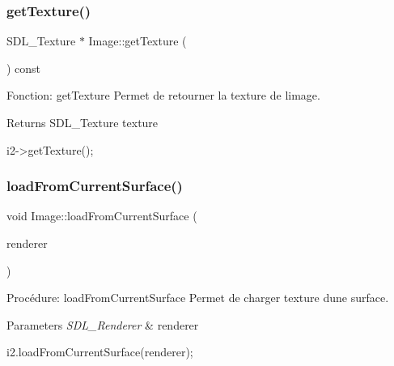\subsubsection{\texorpdfstring{get\+Texture()}{getTexture()}}
{\footnotesize\ttfamily S\+D\+L\+\_\+\+Texture $\ast$ Image\+::get\+Texture (\begin{DoxyParamCaption}{ }\end{DoxyParamCaption}) const}



Fonction\+: get\+Texture Permet de retourner la texture de l\textquotesingle{}image. 

\begin{DoxyReturn}{Returns}
S\+D\+L\+\_\+\+Texture texture 
\begin{DoxyCode}
i2->getTexture();
\end{DoxyCode}
 
\end{DoxyReturn}
\mbox{\label{classImage_aee71e67e123b6fdd1d3c91caa2892792}} 
\subsubsection{\texorpdfstring{load\+From\+Current\+Surface()}{loadFromCurrentSurface()}}
{\footnotesize\ttfamily void Image\+::load\+From\+Current\+Surface (\begin{DoxyParamCaption}\item[{S\+D\+L\+\_\+\+Renderer $\ast$}]{renderer }\end{DoxyParamCaption})}



Procédure\+: load\+From\+Current\+Surface Permet de charger texture d\textquotesingle{}une surface. 


\begin{DoxyParams}{Parameters}
{\em S\+D\+L\+\_\+\+Renderer} & renderer 
\begin{DoxyCode}
i2.loadFromCurrentSurface(renderer);
\end{DoxyCode}
 \\
\hline
\end{DoxyParams}
\mbox{\label{classImage_aa276b5183099671ddeaf8f083068046c}} 
